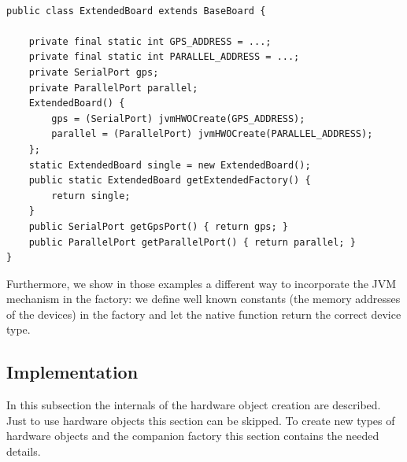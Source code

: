 \begin{lstlisting}[float=t,caption={An extended class of a hardware object
factory for a board variation}, label=lst:hwo:ext:fact]

public class ExtendedBoard extends BaseBoard {

    private final static int GPS_ADDRESS = ...;
    private final static int PARALLEL_ADDRESS = ...;
    private SerialPort gps;
    private ParallelPort parallel;
    ExtendedBoard() {
        gps = (SerialPort) jvmHWOCreate(GPS_ADDRESS);
        parallel = (ParallelPort) jvmHWOCreate(PARALLEL_ADDRESS);
    };
    static ExtendedBoard single = new ExtendedBoard();
    public static ExtendedBoard getExtendedFactory() {
        return single;
    }
    public SerialPort getGpsPort() { return gps; }
    public ParallelPort getParallelPort() { return parallel; }
}
\end{lstlisting}




Furthermore, we show in those examples a different way to incorporate
the JVM mechanism in the factory: we define well known constants (the
memory addresses of the devices) in the factory and let the native
function  return the correct device type.

%
%

\subsection{Implementation}
\label{sec:hwo:implementation} 

In this subsection the internals of the hardware object creation are
described. Just to use hardware objects this section can be skipped.
To create new types of hardware objects and the companion factory
this section contains the needed details.

